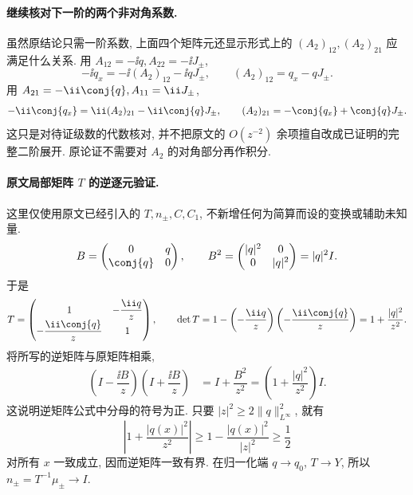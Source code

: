 \paragraph{继续核对下一阶的两个非对角系数.}
虽然原结论只需一阶系数, 上面四个矩阵元还显示形式上的
$(A_2)_{12},(A_2)_{21}$ 应满足什么关系.
用 $A_{12}=-\ii q,A_{22}=-\ii J_\pm$,
\[
-\ii q_x=-\ii(A_2)_{12}-\ii qJ_\pm,
\qquad (A_2)_{12}=q_x-qJ_\pm.
\]
用 $A_{21}=-\ii\conj{q},A_{11}=\ii J_\pm$,
\[
-\ii\conj{q_x}=\ii(A_2)_{21}-\ii\conj{q}J_\pm,
\qquad (A_2)_{21}=-\conj{q_x}+\conj{q}J_\pm.
\]
这只是对待证级数的代数核对, 并不把原文的
$O(z^{-2})$ 余项擅自改成已证明的完整二阶展开.
原论证不需要对 $A_2$ 的对角部分再作积分.

\paragraph{原文局部矩阵 $ T$ 的逆逐元验证.}
这里仅使用原文已经引入的 $ T,n_\pm, C, C_1$,
不新增任何为简算而设的变换或辅助未知量.
\[
B=\begin{pmatrix}0&q\\\conj{q}&0\end{pmatrix},
\qquad
B^2=\begin{pmatrix}|q|^2&0\\0&|q|^2\end{pmatrix}=|q|^2I.
\]
于是
\[
 T=\begin{pmatrix}
1&-\dfrac{\ii q}{z}\\-\dfrac{\ii\conj{q}}{z}&1
\end{pmatrix},
\qquad
\det T
=1-\left(-\dfrac{\ii q}{z}\right)
\left(-\dfrac{\ii\conj{q}}{z}\right)
=1+\dfrac{|q|^2}{z^2}.
\]
将所写的逆矩阵与原矩阵相乘,
\begin{align*}
\left(I-\dfrac{\ii B}{z}\right)
\left(I+\dfrac{\ii B}{z}\right)
&=I+\dfrac{B^2}{z^2}
=\left(1+\dfrac{|q|^2}{z^2}\right)I.
\end{align*}
这说明逆矩阵公式中分母的符号为正.
只要 $|z|^2\ge2\|q\|_{L^\infty}^2$, 就有
\[
\left|1+\dfrac{|q(x)|^2}{z^2}\right|
\ge1-\dfrac{|q(x)|^2}{|z|^2}\ge\dfrac{1}{2}
\]
对所有 $x$ 一致成立, 因而逆矩阵一致有界.
在归一化端 $q\to q_0$, $ T\to Y$,
所以 $n_\pm= T^{-1}\mu_\pm\to I$.


